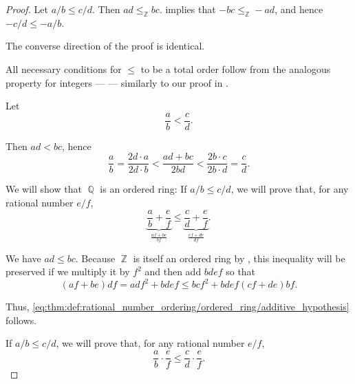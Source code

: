 \begin{proof}
   Let \( a / b \leq c / d \). Then \( ad \leq_\BbbZ bc \).  implies that \( -bc \leq_\BbbZ -ad \), and hence \( -c / d \leq - a / b \).

  The converse direction of the proof is identical.

   All necessary conditions for \( \leq \) to be a total order follow from the analogous property for integers ---  --- similarly to our proof in .

   Let
  \begin{equation*}
    \frac a b < \frac c d.
  \end{equation*}

  Then \( ad < bc \), hence
  \begin{equation*}
    \frac a b = \frac {2d \cdot a} {2d \cdot b} < \frac {ad + bc} {2bd} < \frac {2b \cdot c} {2b \cdot d} = \frac c d.
  \end{equation*}

   We will show that \( \BbbQ \) is an ordered ring:
   If \( a / b \leq c / d \), we will prove that, for any rational number \( e / f \),
  \begin{equation}\label{eq:thm:def:rational_number_ordering/ordered_ring/additive_hypothesis}
    \underbrace{\frac a b + \frac e f}_{\frac {af + be} {bf}} \leq \underbrace{\frac c d  + \frac e f}_{\frac {cf + de} {df}}.
  \end{equation}

  We have \( ad \leq bc \). Because \( \BbbZ \) is itself an ordered ring by , this inequality will be preserved if we multiply it by \( f^2 \) and then add \( bdef \) so that
  \begin{equation*}
    (af + be) df = adf^2 + bdef \leq bcf^2 + bdef (cf + de) bf.
  \end{equation*}

  Thus, \eqref{eq:thm:def:rational_number_ordering/ordered_ring/additive_hypothesis} follows.

   If \( a / b \leq c / d \), we will prove that, for any rational number \( e / f \),
  \begin{equation}\label{eq:thm:def:rational_number_ordering/ordered_ring/multiplicative_hypothesis}
    \frac a b \cdot \frac e f \leq \frac c d \cdot \frac e f.
  \end{equation}


\end{proof}
